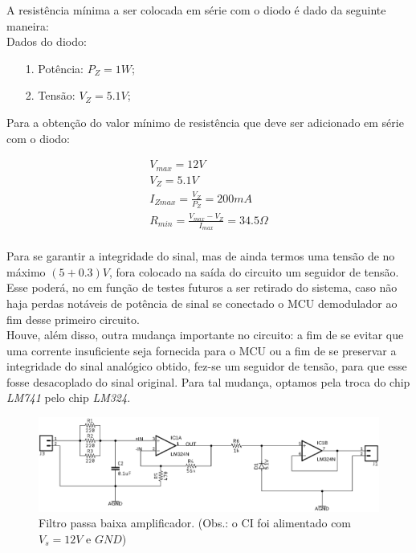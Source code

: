 \documentclass[12pt,a4paper]{report}
\begin{document}
		A resistência mínima a ser colocada em série com o diodo é dado da seguinte maneira:\\
		
		Dados do diodo:
		\begin{itemize}
			\item[1.] Potência: $P_Z = 1W$;
			\item[2.] Tensão: $V_Z = 5.1V$;
		\end{itemize}
		
		Para a obtenção do valor mínimo de resistência que deve ser adicionado em série com o diodo:
		
		\begin{center}
			\begin{gather}
				V_{max} = 12V\\
				V_Z = 5.1V\\
				I_{Zmax} = \frac{V_Z}{P_Z} = 200mA\\
				R_{min} = \frac{V_{max} - V_Z}{I_{max}} = 34.5\Omega\\
			\end{gather}
		\end{center}
		
		Para se garantir a integridade do sinal, mas de ainda termos uma tensão de no máximo $(5 + 0.3)V$, fora colocado na saída do circuito um seguidor de tensão. Esse poderá, no em função de testes futuros a ser retirado do sistema, caso não haja perdas notáveis de potência de sinal se conectado o MCU demodulador ao fim desse primeiro circuito.\\
		
		Houve, além disso, outra mudança importante no circuito: a fim de se evitar que uma corrente insuficiente seja fornecida para o MCU ou a fim de se preservar a integridade do sinal analógico obtido, fez-se um seguidor de tensão, para que esse fosse desacoplado do sinal original. Para tal mudança, optamos pela troca do chip {\it LM741} pelo chip {\it LM324}.
		
		\begin{figure}[h]
			\includegraphics[width=\linewidth]{corrected_filter.png}
			\caption{Filtro passa baixa amplificador. (Obs.: o CI foi alimentado com $V_s = 12V$ e $GND$)}
			\label{fig:filter}
		\end{figure}
			
\end{document}
